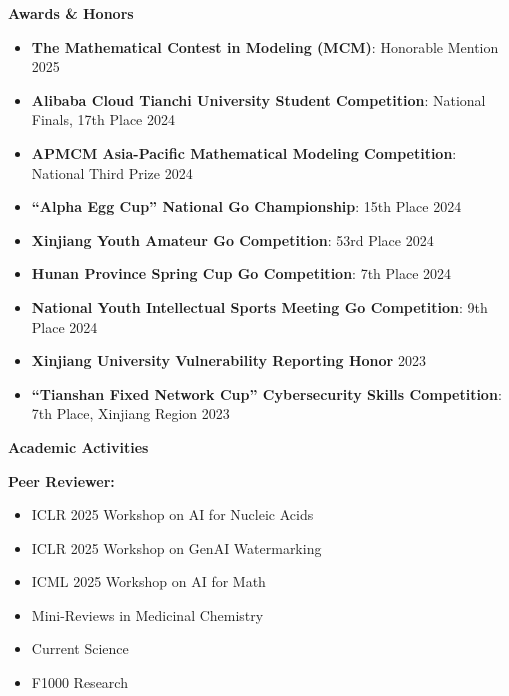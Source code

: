 \documentclass[11pt]{article}
\begin{document}
	\vspace{12pt}
	
	\begin{center}
		\textbf{\large Awards \& Honors}
	\end{center}
	\begin{itemize}[noitemsep, topsep=0pt, partopsep=0pt, parsep=0pt, leftmargin=*]
		\item \textbf{The Mathematical Contest in Modeling (MCM)}: Honorable Mention \hfill 2025
		\item \textbf{Alibaba Cloud Tianchi University Student Competition}: National Finals, 17th Place \hfill 2024
		\item \textbf{APMCM Asia-Pacific Mathematical Modeling Competition}: National Third Prize \hfill 2024
		\item \textbf{“Alpha Egg Cup” National Go Championship}: 15th Place \hfill 2024
		\item \textbf{Xinjiang Youth Amateur Go Competition}: 53rd Place \hfill 2024
		\item \textbf{Hunan Province Spring Cup Go Competition}: 7th Place \hfill 2024
		\item \textbf{National Youth Intellectual Sports Meeting Go Competition}: 9th Place \hfill 2024
		\item \textbf{Xinjiang University Vulnerability Reporting Honor} \hfill 2023
		\item \textbf{“Tianshan Fixed Network Cup” Cybersecurity Skills Competition}: 7th Place, Xinjiang Region \hfill 2023
	\end{itemize}
	
	\vspace{12pt}
	\clearpage
	\begin{center}
		\textbf{\large Academic Activities}
	\end{center}
	\textbf{Peer Reviewer:}
	\begin{multicols}{2}
		\begin{itemize}[noitemsep, topsep=0pt, partopsep=0pt, parsep=0pt, leftmargin=*]
			\item ICLR 2025 Workshop on AI for Nucleic Acids
			\item ICLR 2025 Workshop on GenAI Watermarking
			\item ICML 2025 Workshop on AI for Math
			\item Mini-Reviews in Medicinal Chemistry
			\item Current Science
			\item F1000 Research
		\end{itemize}
	\end{multicols}
	
\end{document}
